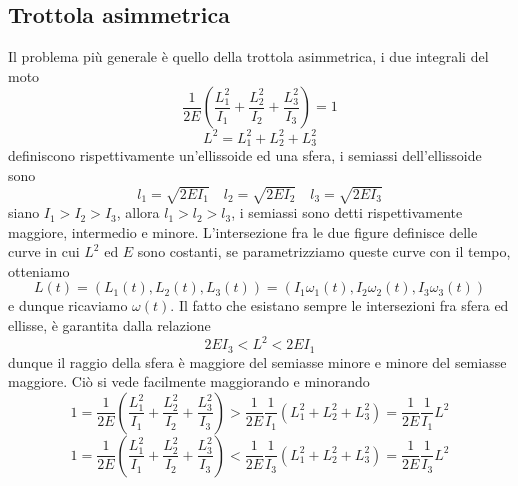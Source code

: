\documentclass[
10pt, %
a4paper, %
oneside, %
headinclude,footinclude, %
BCOR5mm, %
]{scrartcl}
\begin{document}
\subsection{Trottola asimmetrica}
Il problema più generale è quello della trottola asimmetrica, i due integrali del moto
\[\frac{1}{2E}\left(\frac{L^2_1}{I_1}+\frac{L^2_2}{I_2}+\frac{L^2_3}{I_3}\right) = 1\]
\[L^2 = L_1^2+L_2^2+L_3^2\]
definiscono rispettivamente un'ellissoide ed una sfera, i semiassi dell'ellissoide sono 
\[l_1 = \sqrt{2EI_1}\quad l_2 = \sqrt{2EI_2}\quad l_3 = \sqrt{2EI_3}\]
siano \(I_1>I_2>I_3\), allora \(l_1>l_2>l_3\), i semiassi sono detti rispettivamente maggiore, intermedio e minore.
L'intersezione fra le due figure definisce delle curve in cui \(L^2\) ed \(E\) sono costanti, se parametrizziamo queste curve con il tempo, otteniamo 
\[L(t) = (L_1(t), L_2(t), L_3(t)) = (I_1\omega_1(t), I_2\omega_2(t), I_3\omega_3(t))\]
e dunque ricaviamo \(\omega(t)\). Il fatto che esistano sempre le intersezioni fra sfera ed ellisse, è garantita dalla relazione
\[2EI_3<L^2<2EI_1\]
dunque il raggio della sfera è maggiore del semiasse minore e minore del semiasse maggiore. Ciò si vede facilmente maggiorando e minorando
\[1 = \frac{1}{2E}\left(\frac{L^2_1}{I_1}+\frac{L^2_2}{I_2}+\frac{L^2_3}{I_3}\right)> \frac{1}{2E}\frac{1}{I_1}\left({L^2_1}+{L^2_2}+{L^2_3}\right) = \frac{1}{2E}\frac{1}{I_1}L^2\]
\[1 = \frac{1}{2E}\left(\frac{L^2_1}{I_1}+\frac{L^2_2}{I_2}+\frac{L^2_3}{I_3}\right)< \frac{1}{2E}\frac{1}{I_3}\left({L^2_1}+{L^2_2}+{L^2_3}\right) = \frac{1}{2E}\frac{1}{I_3}L^2\]
\end{document}
